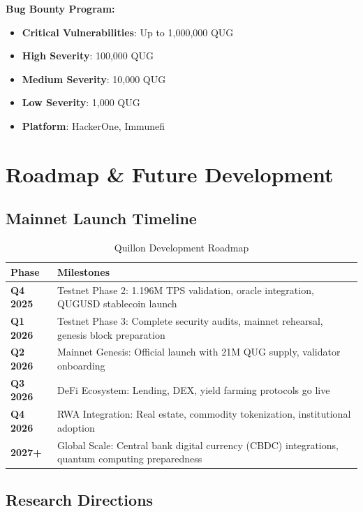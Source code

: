 \documentclass[11pt,a4paper]{scrartcl}
\begin{document}
\textbf{Bug Bounty Program:}
\begin{itemize}
\item \textbf{Critical Vulnerabilities}: Up to 1,000,000 QUG
\item \textbf{High Severity}: 100,000 QUG
\item \textbf{Medium Severity}: 10,000 QUG
\item \textbf{Low Severity}: 1,000 QUG
\item \textbf{Platform}: HackerOne, Immunefi
\end{itemize}

\newpage

\section{Roadmap \& Future Development}

\subsection{Mainnet Launch Timeline}

\begin{table}[h]
\centering
\begin{tabular}{lp{10cm}}
\toprule
\textbf{Phase} & \textbf{Milestones} \\
\midrule
\textbf{Q4 2025} & Testnet Phase 2: 1.196M TPS validation, oracle integration, QUGUSD stablecoin launch \\
\textbf{Q1 2026} & Testnet Phase 3: Complete security audits, mainnet rehearsal, genesis block preparation \\
\textbf{Q2 2026} & Mainnet Genesis: Official launch with 21M QUG supply, validator onboarding \\
\textbf{Q3 2026} & DeFi Ecosystem: Lending, DEX, yield farming protocols go live \\
\textbf{Q4 2026} & RWA Integration: Real estate, commodity tokenization, institutional adoption \\
\textbf{2027+} & Global Scale: Central bank digital currency (CBDC) integrations, quantum computing preparedness \\
\bottomrule
\end{tabular}
\caption{Quillon Development Roadmap}
\end{table}

\subsection{Research Directions}
\end{document}
